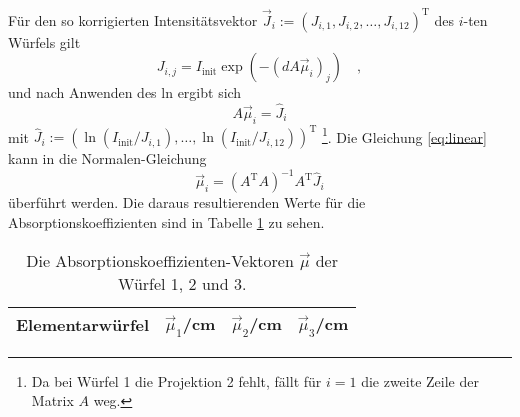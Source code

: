 Für den so korrigierten Intensitätsvektor $\vec{J}_i:=(J_{i,1},J_{i,2},\ldots,J_{i,12})^\text{T}$
des $i$-ten Würfels gilt
\begin{equation}
J_{i,j}=I_\text{init}\exp\left(- (d A \vec{\mu}_i)_j \right) \quad ,
\end{equation}
und nach Anwenden des ln ergibt sich
\begin{equation}
A \vec{\mu}_i = \hat{J}_i \label{eq:linear}
\end{equation}
mit $\hat{J}_i:=(\ln(I_\text{init}/J_{i,1}),\ldots,\ln(I_\text{init}/J_{i,12}))^\text{T}$
  \footnote{
Da bei Würfel 1 die Projektion 2 fehlt, fällt für $i=1$ die zweite Zeile der Matrix $A$ weg.}.
Die Gleichung \eqref{eq:linear} kann in die Normalen-Gleichung
\begin{equation}
\vec{\mu}_i = \left( A^\text{T}A \right)^{-1} A^\text{T} \hat{J}_i \label{eq:linear2}
\end{equation}
überführt werden. Die daraus resultierenden Werte für die Absorptionskoeffizienten sind in
Tabelle \ref{tab:Koeff} zu sehen.
\begin{table}[h]
\centering
\begin{tabular}{cccc}
\toprule
\midrule
Elementarwürfel & $\vec{\mu}_1$/cm & $\vec{\mu}_2$/cm & $\vec{\mu}_3$/cm \\
\midrule

\midrule
\bottomrule
\end{tabular}
\caption{Die Absorptionskoeffizienten-Vektoren $\vec{\mu}$ der Würfel 1, 2 und 3.}
\label{tab:Koeff}
\end{table}
\clearpage
